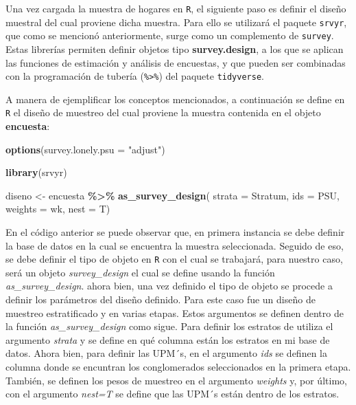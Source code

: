 \documentclass[
  12pt,
]{book}
\newenvironment{Shaded}{\begin{snugshade}}{\end{snugshade}}
\newcommand{\AttributeTok}[1]{\textcolor[rgb]{0.13,0.29,0.53}{#1}}
\newcommand{\FunctionTok}[1]{\textcolor[rgb]{0.13,0.29,0.53}{\textbf{#1}}}
\newcommand{\NormalTok}[1]{#1}
\newcommand{\OtherTok}[1]{\textcolor[rgb]{0.56,0.35,0.01}{#1}}
\newcommand{\SpecialCharTok}[1]{\textcolor[rgb]{0.81,0.36,0.00}{\textbf{#1}}}
\newcommand{\StringTok}[1]{\textcolor[rgb]{0.31,0.60,0.02}{#1}}
\begin{document}
Una vez cargada la muestra de hogares en \texttt{R}, el siguiente paso es definir el diseño muestral del cual proviene dicha muestra. Para ello se utilizará el paquete \texttt{srvyr}, que como se mencionó anteriormente, surge como un complemento de \texttt{survey}. Estas librerías permiten definir objetos tipo \textbf{survey.design}, a los que se aplican las funciones de estimación y análisis de encuestas, y que pueden ser combinadas con la programación de tubería (\texttt{\%\textgreater{}\%}) del paquete \texttt{tidyverse}.

A manera de ejemplificar los conceptos mencionados, a continuación se define en \texttt{R} el diseño de muestreo del cual proviene la muestra contenida en el objeto \textbf{encuesta}:

\begin{Shaded}
\begin{Highlighting}[]
\FunctionTok{options}\NormalTok{(}\AttributeTok{survey.lonely.psu =} \StringTok{"adjust"}\NormalTok{) }

\FunctionTok{library}\NormalTok{(srvyr)}

\NormalTok{diseno }\OtherTok{\textless{}{-}}\NormalTok{ encuesta }\SpecialCharTok{\%\textgreater{}\%} 
  \FunctionTok{as\_survey\_design}\NormalTok{(}
    \AttributeTok{strata =}\NormalTok{ Stratum,  }
    \AttributeTok{ids =}\NormalTok{ PSU,        }
    \AttributeTok{weights =}\NormalTok{ wk,      }
    \AttributeTok{nest =}\NormalTok{ T)}
\end{Highlighting}
\end{Shaded}

En el código anterior se puede observar que, en primera instancia se debe definir la base de datos en la cual se encuentra la muestra seleccionada. Seguido de eso, se debe definir el tipo de objeto en \texttt{R} con el cual se trabajará, para nuestro caso, será un objeto \emph{survey\_design} el cual se define usando la función \emph{as\_survey\_design}. ahora bien, una vez definido el tipo de objeto se procede a definir los parámetros del diseño definido. Para este caso fue un diseño de muestreo estratificado y en varias etapas. Estos argumentos se definen dentro de la función \emph{as\_survey\_design} como sigue. Para definir los estratos de utiliza el argumento \emph{strata} y se define en qué columna están los estratos en mi base de datos. Ahora bien, para definir las UPM´s, en el argumento \emph{ids} se definen la columna donde se encuntran los conglomerados seleccionados en la primera etapa. También, se definen los pesos de muestreo en el argumento \emph{weights} y, por último, con el argumento \emph{nest=T} se define que las UPM´s están dentro de los estratos.
\end{document}
